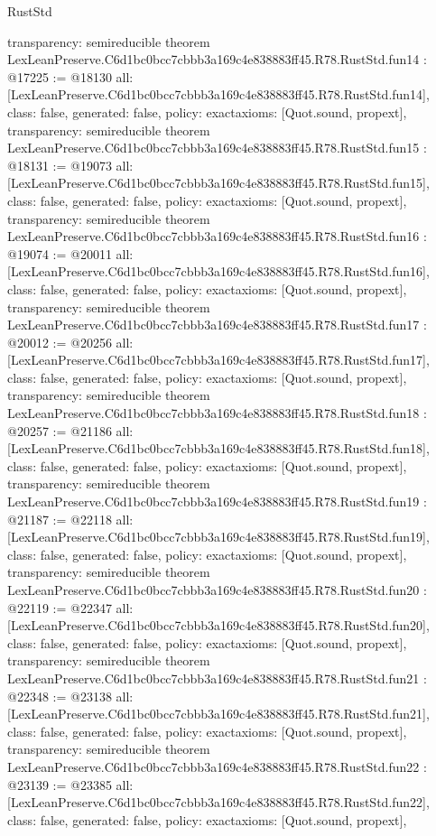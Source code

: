 \begin{lexlean}{RustStd}
\begin{coremodule}
{  transparency: semireducible
}
theorem LexLeanPreserve.C6d1bc0bcc7cbbb3a169c4e838883ff45.R78.RustStd.fun14 : @17225 := @18130 {
  all: [LexLeanPreserve.C6d1bc0bcc7cbbb3a169c4e838883ff45.R78.RustStd.fun14],
  class: false,
  generated: false,
  policy: exact{axioms: [Quot.sound, propext]},
  transparency: semireducible
}
theorem LexLeanPreserve.C6d1bc0bcc7cbbb3a169c4e838883ff45.R78.RustStd.fun15 : @18131 := @19073 {
  all: [LexLeanPreserve.C6d1bc0bcc7cbbb3a169c4e838883ff45.R78.RustStd.fun15],
  class: false,
  generated: false,
  policy: exact{axioms: [Quot.sound, propext]},
  transparency: semireducible
}
theorem LexLeanPreserve.C6d1bc0bcc7cbbb3a169c4e838883ff45.R78.RustStd.fun16 : @19074 := @20011 {
  all: [LexLeanPreserve.C6d1bc0bcc7cbbb3a169c4e838883ff45.R78.RustStd.fun16],
  class: false,
  generated: false,
  policy: exact{axioms: [Quot.sound, propext]},
  transparency: semireducible
}
theorem LexLeanPreserve.C6d1bc0bcc7cbbb3a169c4e838883ff45.R78.RustStd.fun17 : @20012 := @20256 {
  all: [LexLeanPreserve.C6d1bc0bcc7cbbb3a169c4e838883ff45.R78.RustStd.fun17],
  class: false,
  generated: false,
  policy: exact{axioms: [Quot.sound, propext]},
  transparency: semireducible
}
theorem LexLeanPreserve.C6d1bc0bcc7cbbb3a169c4e838883ff45.R78.RustStd.fun18 : @20257 := @21186 {
  all: [LexLeanPreserve.C6d1bc0bcc7cbbb3a169c4e838883ff45.R78.RustStd.fun18],
  class: false,
  generated: false,
  policy: exact{axioms: [Quot.sound, propext]},
  transparency: semireducible
}
theorem LexLeanPreserve.C6d1bc0bcc7cbbb3a169c4e838883ff45.R78.RustStd.fun19 : @21187 := @22118 {
  all: [LexLeanPreserve.C6d1bc0bcc7cbbb3a169c4e838883ff45.R78.RustStd.fun19],
  class: false,
  generated: false,
  policy: exact{axioms: [Quot.sound, propext]},
  transparency: semireducible
}
theorem LexLeanPreserve.C6d1bc0bcc7cbbb3a169c4e838883ff45.R78.RustStd.fun20 : @22119 := @22347 {
  all: [LexLeanPreserve.C6d1bc0bcc7cbbb3a169c4e838883ff45.R78.RustStd.fun20],
  class: false,
  generated: false,
  policy: exact{axioms: [Quot.sound, propext]},
  transparency: semireducible
}
theorem LexLeanPreserve.C6d1bc0bcc7cbbb3a169c4e838883ff45.R78.RustStd.fun21 : @22348 := @23138 {
  all: [LexLeanPreserve.C6d1bc0bcc7cbbb3a169c4e838883ff45.R78.RustStd.fun21],
  class: false,
  generated: false,
  policy: exact{axioms: [Quot.sound, propext]},
  transparency: semireducible
}
theorem LexLeanPreserve.C6d1bc0bcc7cbbb3a169c4e838883ff45.R78.RustStd.fun22 : @23139 := @23385 {
  all: [LexLeanPreserve.C6d1bc0bcc7cbbb3a169c4e838883ff45.R78.RustStd.fun22],
  class: false,
  generated: false,
  policy: exact{axioms: [Quot.sound, propext]},
}
\end{coremodule}
\end{lexlean}
